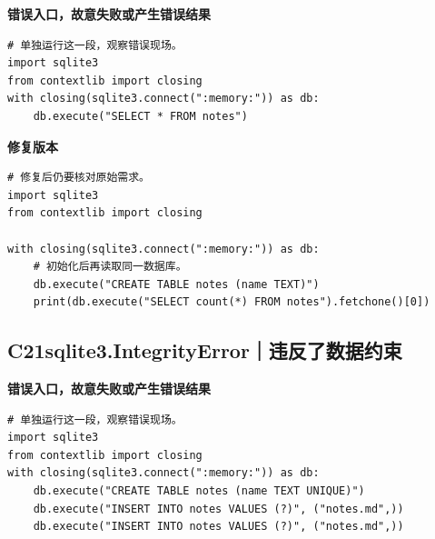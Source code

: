 



\textbf{错误入口，故意失败或产生错误结果}

\begin{lstlisting}[style=errorcode,title={错误复现（故意失败或错误结果）：\code{case_20_bad.py.txt}}]
# 单独运行这一段，观察错误现场。
import sqlite3
from contextlib import closing
with closing(sqlite3.connect(":memory:")) as db:
    db.execute("SELECT * FROM notes")
\end{lstlisting}

\textbf{修复版本}

\begin{lstlisting}[title={\code{case_20.py}}]
# 修复后仍要核对原始需求。
import sqlite3
from contextlib import closing

with closing(sqlite3.connect(":memory:")) as db:
    # 初始化后再读取同一数据库。
    db.execute("CREATE TABLE notes (name TEXT)")
    print(db.execute("SELECT count(*) FROM notes").fetchone()[0])
\end{lstlisting}


\subsection*{C21\enspace sqlite3.IntegrityError｜违反了数据约束}





\textbf{错误入口，故意失败或产生错误结果}

\begin{lstlisting}[style=errorcode,title={错误复现（故意失败或错误结果）：\code{case_21_bad.py.txt}}]
# 单独运行这一段，观察错误现场。
import sqlite3
from contextlib import closing
with closing(sqlite3.connect(":memory:")) as db:
    db.execute("CREATE TABLE notes (name TEXT UNIQUE)")
    db.execute("INSERT INTO notes VALUES (?)", ("notes.md",))
    db.execute("INSERT INTO notes VALUES (?)", ("notes.md",))
\end{lstlisting}

